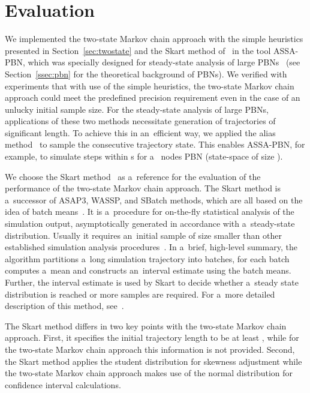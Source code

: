 \documentclass[runningheads,a4paper]{llncs}
\begin{document}
\section{Evaluation}
\label{sec:evaluation}
We implemented the two-state Markov chain approach with the simple heuristics presented in
Section~\ref{sec:twostate} and the Skart method of~\cite{TWLS08} in the tool {\sf ASSA-PBN},
which was specially designed for steady-state analysis of large PBNs~\cite{assa}
(see Section~\ref{ssec:pbn} for the theoretical background of PBNs).
We verified with experiments that with use of the simple heuristics,
the two-state Markov chain approach could meet the predefined precision requirement
even in the case of an unlucky initial sample size.
For the steady-state analysis of large PBNs, applications of these two
methods necessitate generation of trajectories of significant length. To achieve this in
an~efficient way, we applied the alias method~\cite{WAJ77} to sample the consecutive trajectory
state. This enables {\sf ASSA-PBN}, for example, to simulate  steps within s for
a~ nodes PBN (state-space of size ).

We choose the Skart method~\cite{TWLS08} as a~reference for the evaluation of the performance
of the two-state Markov chain approach. The Skart method is a~successor of ASAP3, WASSP, and
SBatch methods, which are all based on the idea of batch means~\cite{TWLS08}. It is
a~procedure for on-the-fly statistical analysis of the simulation output, asymptotically
generated in accordance with a~steady-state distribution. Usually it requires an~initial sample of
size smaller than other established simulation analysis procedures~\cite{TWLS08}. In a~brief,
high-level summary, the algorithm partitions a~long simulation trajectory into batches, for each
batch computes a~mean and constructs an~interval estimate using the batch means. Further,
the interval estimate is used by Skart to decide whether a~steady state distribution is
reached or more samples are required. For a~more detailed description of this method,
see~\cite{TWLS08}.



The Skart method differs in two key points with the two-state Markov chain approach.
First, it specifies the initial trajectory length to be at least , while for the two-state
Markov chain approach this information is not provided. Second, the Skart method applies the student distribution for skewness adjustment while the
two-state Markov chain approach makes use of the normal distribution for confidence interval
calculations.
\end{document}
